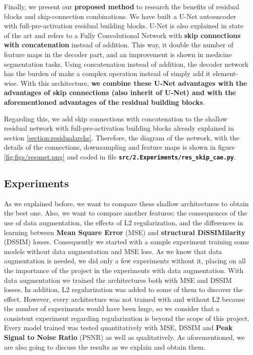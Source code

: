 Finally, we present our \textbf{proposed method} to research the benefits of residual blocks and skip-connection combinations. We have built a U-Net autoencoder with full-pre-activation residual building blocks. U-Net is also explained in state of the art and refers to a Fully Convolutional Network with \textbf{skip connections with concatenation} instead of addition. This way, it double the number of feature maps in the decoder part, and an improvement is shown in medicine segmentation tasks. Using concatenation instead of addition, the decoder network has the burden of make a complex operation instead of simply add it element-wise. With this architecture, \textbf{we combine these U-Net advantages with the advantages of skip connections (also inherit of U-Net) and with the aforementioned advantages of the residual building blocks}.

Regarding this, we add skip connections with concatenation to the shallow residual network with full-pre-activation building blocks already explained in section \ref{section:residualarchs}. Therefore, the diagram of the network, with the details of the connections, downsampling and feature maps is shown in figure \ref{fig:figs/resunet.png} and coded in file \textbf{\texttt{src/2.Experiments\-/res\_sk\-ip\_cae.py}}.


\clearpage

\subsection{Experiments}
\label{subsection:experiments}

As we explained before, we want to compare these shallow architectures to obtain the best one. Also, we want to compare another features: the consequences of the use of data augmentation, the effects of L2 regularization, and the differences in learning between \textbf{Mean Square Error} (MSE) and \textbf{structural DiSSIMilarity} (DSSIM) losses. Consequently we started with a sample experiment training some models without data augmentation and MSE loss. As we know that data augmentation is needed, we did only a few experiments without it, placing on all the importance of the project in the experiments with data augmentation. With data augmentation we trained the architectures both with MSE and DSSIM losses. In addition, L2 regularization was added to some of them to discover the effect. However, every architecture was not trained with and without L2 because the number of experiments would have been huge, so we consider that a consistent experiment regarding regularization is beyond the scope of this project. Every model trained was tested quantitatively with MSE, DSSIM and \textbf{Peak Signal to Noise Ratio} (PSNR) as well as qualitatively. As aforementioned, we are also going to discuss the results as we explain and obtain them.

